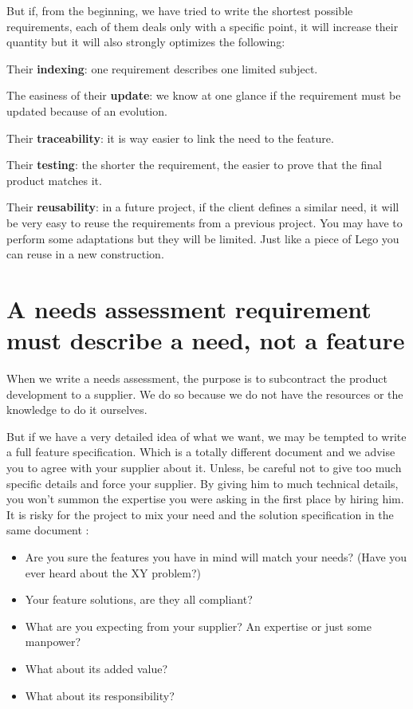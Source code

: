 But if, from the beginning, we have tried to write the shortest possible requirements, each of them deals only with a specific point, it will increase their quantity but it will also strongly optimizes the following:

Their \textbf{indexing}: one requirement describes one limited subject.

The easiness of their \textbf{update}: we know at one glance if the requirement must be updated because of an evolution.

Their \textbf{traceability}: it is way easier to link the need to the feature.

Their \textbf{testing}: the shorter the requirement, the easier to prove that the final product matches it.

Their \textbf{reusability}: in a future project, if the client defines a similar need, it will be very easy to reuse the requirements from a previous project. You may have to perform some adaptations but they will be limited. Just like a piece of Lego you can reuse in a new construction.

\section{A needs assessment requirement must describe a need, not a feature}
When we write a needs assessment, the purpose is to subcontract the product development to a supplier. We do so because we do not have the resources or the knowledge to do it ourselves.

But if we have a very detailed idea of what we want, we may be tempted to write a full feature specification. Which is a totally different document and we advise you to agree with your supplier about it. Unless, be careful not to give too much specific details and force your supplier. By giving him to much technical details, you won’t summon the expertise you were asking in the first place by hiring him. It is risky for the project to mix your need and the solution specification in the same document :

\begin{itemize}
    \item Are you sure the features you have in mind will match your needs? (Have you ever heard about the XY problem?)
    \item Your feature solutions, are they all compliant?
    \item What are you expecting from your supplier? An expertise or just some manpower?
    \item What about its added value?
    \item What about its responsibility?
\end{itemize}

